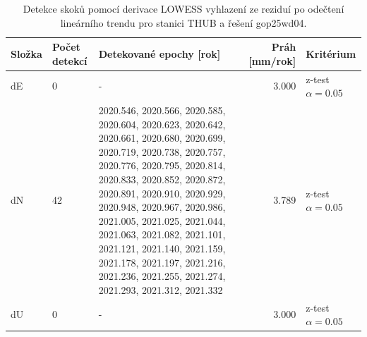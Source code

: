 \begin{table}[htbp]
\caption{Detekce skoků pomocí derivace LOWESS vyhlazení ze reziduí po odečtení lineárního trendu pro stanici THUB a řešení gop25wd04.}
\label{tab:gop25wd04_stcd_thub_detr_weighted_1seg_jumps_lowess_derivative}
\begin{tabular}{lllrl}
\toprule
Složka & Počet detekcí & Detekované epochy [rok] & Práh [mm/rok] & Kritérium \\
\midrule
dE & 0 & - & 3.000 & z-test $\alpha=0.05$ \\
dN & 42 & 2020.546, 2020.566, 2020.585, 2020.604, 2020.623, 2020.642, 2020.661, 2020.680, 2020.699, 2020.719, 2020.738, 2020.757, 2020.776, 2020.795, 2020.814, 2020.833, 2020.852, 2020.872, 2020.891, 2020.910, 2020.929, 2020.948, 2020.967, 2020.986, 2021.005, 2021.025, 2021.044, 2021.063, 2021.082, 2021.101, 2021.121, 2021.140, 2021.159, 2021.178, 2021.197, 2021.216, 2021.236, 2021.255, 2021.274, 2021.293, 2021.312, 2021.332 & 3.789 & z-test $\alpha=0.05$ \\
dU & 0 & - & 3.000 & z-test $\alpha=0.05$ \\
\bottomrule
\end{tabular}
\end{table}
